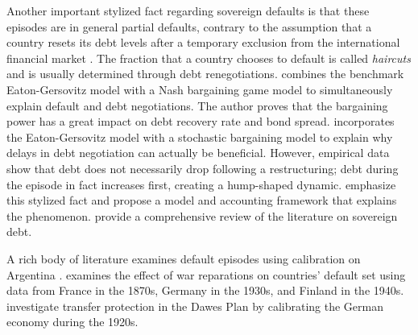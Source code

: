 Another important stylized fact regarding sovereign defaults is that these episodes are in general partial defaults, contrary to the assumption that a country resets its debt levels after a temporary exclusion from the international financial market \citep[see][]{Sturzenegger-Zettelmeyer-08,Cruces-Trebesch-13}. The fraction that a country chooses to default is called \emph{haircuts} and is usually determined through debt renegotiations.
\citet{Yue-10} combines the benchmark Eaton-Gersovitz model with a Nash bargaining game model to simultaneously explain default and debt negotiations. The author proves that the bargaining power has a great impact on debt recovery rate and bond spread.
\citet{Bi-08} incorporates the Eaton-Gersovitz model with a stochastic bargaining model to explain why delays in debt negotiation can actually be beneficial.
However, empirical data show that debt does not necessarily drop following a restructuring; debt during the episode in fact increases first, creating a hump-shaped dynamic. \citet{Arellano-23-partial-default} emphasize this stylized fact and propose a model and accounting framework that explains the phenomenon. \citet{sovereign-debt-review-yue-19} provide a comprehensive review of the literature on sovereign debt.


A rich body of literature examines default episodes using calibration on Argentina \citep{Arellano-08, Schmitt-Uribe-16,Mendoza-Yue-12,Na-18}. \citet*{Hinrichsen_2020-chapter4} examines the effect of war reparations on countries' default set using data from France in the 1870s, Germany in the 1930s, and Finland in the 1940s. \citet*{Ho-Ritschl-23} investigate transfer protection in the Dawes Plan by calibrating the German economy during the 1920s.